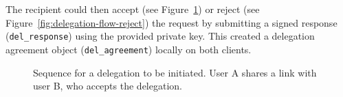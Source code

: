 The recipient could then accept (see Figure~\ref{fig:delegation-flow-accept}) or reject (see Figure~\ref{fig:delegation-flow-reject}) the request by submitting a signed response (\texttt{del\_response}) using the provided private key. This created a delegation agreement object (\texttt{del\_agreement}) locally on both clients.




\begin{figure}[H]
  \centering
  \caption{Sequence for a delegation to be initiated. User A shares a link with user B, who accepts the delegation.}
  \label{fig:delegation-flow-accept}
\end{figure}


